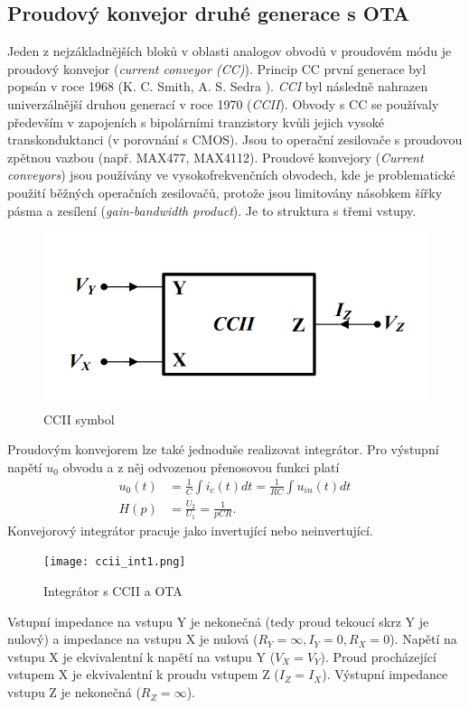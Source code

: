 \subsection{Proudový konvejor druhé generace s OTA}
Jeden z nejzákladnějších bloků v oblasti analogov obvodů v proudovém módu je proudový konvejor (\textit{current conveyor (CC)}). Princip CC první generace byl popsán v roce 1968 (K. C. Smith, A. S. Sedra \cite{6}). \textit{CCI} byl následně nahrazen univerzálnější druhou generací v roce 1970 (\textit{CCII})\cite{7}. Obvody s CC se používaly především v zapojeních s bipolárními tranzistory kvůli jejich vysoké transkonduktanci (v porovnání s CMOS). Jsou to operační zesilovače s proudovou zpětnou vazbou (např. MAX477, MAX4112). Proudové konvejory (\textit{Current conveyors}) jsou používány ve vysokofrekvenčních obvodech, kde je problematické použití běžných operačních zesilovačů, protože jsou limitovány násobkem šířky pásma a zesílení (\textit{gain-bandwidth product}). Je to struktura s třemi vstupy.
\begin{figure}[h]
\centering
\includegraphics[scale=0.4]{ccii.png}
\caption[CCII symbol]{CCII symbol \cite{8}}
\end{figure}
\noindent Proudovým konvejorem lze také jednoduše realizovat integrátor. Pro výstupní napětí $u_0$ obvodu a z něj odvozenou přenosovou funkci platí
\begin{align}
u_0(t) &= \frac{1}{C}\int i_c(t)dt = \frac{1}{RC}\int u_{in}(t)dt \\
H(p) &= \frac{U_2}{U_1} = \frac{1}{pCR}.
\end{align}
\noindent Konvejorový integrátor pracuje jako invertující nebo neinvertující.
\begin{figure}[h]
\centering
\texttt{[image: ccii\_int1.png]}
\caption[Integrátor s CCII a OTA]{Integrátor s CCII a OTA \cite{3}}
\end{figure}
\noindent Vstupní impedance na vstupu Y je nekonečná (tedy proud tekoucí skrz Y je nulový) a impedance na vstupu X je nulová ($R_Y = \infty, I_Y = 0, R_X = 0$). Napětí na vstupu X je ekvivalentní k napětí na vstupu Y ($V_X = V_Y$). Proud procházející vstupem X je ekvivalentní k proudu vstupem Z ($I_Z = I_X$). Výstupní impedance vstupu Z je nekonečná ($R_Z = \infty$).
